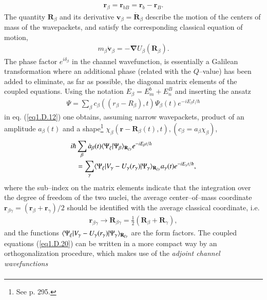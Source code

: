 \begin{subappendices}
\begin{align}\label{eq1.D.17}
\mathbf r_\beta=\mathbf r_{bB}=\mathbf r_b-\mathbf r_B.
\end{align}
The quantity $\mathbf R_\beta$ and its derivative $\mathbf v_\beta=\mathbf{\dot R}_\beta$ describe the motion of the centers of mass of the wavepackets, and satisfy the corresponding classical equation of motion,
\begin{align}\label{eq1.D.18}
m_\beta\mathbf{\dot v}_\beta=-\boldsymbol\nabla U_\beta(\mathbf R_\beta).
\end{align}
The phase factor $e^{i\delta_\beta}$ in the channel wavefunction, is essentially a Galilean transformation where an additional phase (related with the $Q$--value) has been added to eliminate, as far as possible, the diagonal matrix elements of the coupled equations. Using the notation $E_\beta=E_m^b+E_n^B$ and inserting the ansatz
\begin{align}\label{eq1.D.19}
\Psi=\sum_{\beta}c_\beta((r_\beta-R_\beta),t)\Psi_\beta(t)e^{-iE_\beta t/\hbar}
\end{align}
in eq. (\ref{eq1.D.12}) one obtains, assuming narrow wavepackets, product of an amplitude $a_\beta(t)$ and a shape\footnote{See \cite{Broglia:04a} p. 295.} $\chi_\beta(\mathbf r-\mathbf R_\beta(t),t), (c_\beta=a_\beta\chi_\beta)$,
\begin{align}\label{eq1.D.20}
\nonumber i\hbar & \sum_{\beta}\dot a_\beta(t)\langle {\Psi_\xi|\Psi_\beta} \rangle_{\mathbf R_{\xi\gamma}}e^{-iE_\beta t/\hbar}\\
&=\sum_{\gamma}\langle {\Psi_\xi|V_\gamma-U_\gamma(r_\gamma)|\Psi_\gamma} \rangle_{\mathbf R_{\xi\gamma}}a_\gamma(t)e^{-iE_\gamma t/\hbar},
\end{align}
where the sub--index on the matrix elements indicate that the integration over the degree of freedom of the two nuclei, the average center--of--mass coordinate $\mathbf r_{\beta\gamma}=(\mathbf r_\beta+\mathbf r_\gamma)/2$ should be identified with the average classical coordinate, i.e.
\begin{align}\label{eq1.D.21}
\mathbf r_{\beta\gamma}\rightarrow\mathbf R_{\beta\gamma}=\frac{1}{2}(\mathbf R_\beta+\mathbf R_\gamma),
\end{align}
and the functions $\langle {\Psi_\xi|V_\gamma-U_\gamma(r_\gamma)|\Psi_\gamma} \rangle_{\mathbf R_{\xi\gamma}}$
 are the form factors. The coupled equations (\ref{eq1.D.20}) can be written in a more compact way by an orthogonalization procedure, which makes use of the \textit{adjoint channel wavefunctions}
\begin{align}\label{eq1.D.22}

\end{align}
\end{subappendices}
